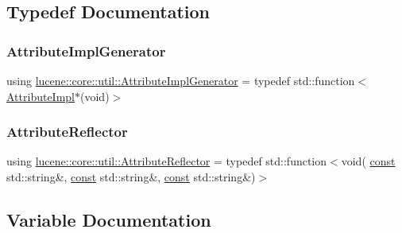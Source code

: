 \subsection{Typedef Documentation}
\mbox{\label{namespacelucene_1_1core_1_1util_acbd8821be7d7b29749374e57b0a7c40b}} 
\subsubsection{\texorpdfstring{Attribute\+Impl\+Generator}{AttributeImplGenerator}}
{\footnotesize\ttfamily using \mbox{\hyperlink{namespacelucene_1_1core_1_1util_acbd8821be7d7b29749374e57b0a7c40b}{lucene\+::core\+::util\+::\+Attribute\+Impl\+Generator}} = typedef std\+::function$<$\mbox{\hyperlink{classlucene_1_1core_1_1util_1_1AttributeImpl}{Attribute\+Impl}}$\ast$(void)$>$}

\mbox{\label{namespacelucene_1_1core_1_1util_a7dbb701adaed055f73fb95eec83da10a}} 
\subsubsection{\texorpdfstring{Attribute\+Reflector}{AttributeReflector}}
{\footnotesize\ttfamily using \mbox{\hyperlink{namespacelucene_1_1core_1_1util_a7dbb701adaed055f73fb95eec83da10a}{lucene\+::core\+::util\+::\+Attribute\+Reflector}} = typedef std\+::function$<$void( \mbox{\hyperlink{ZlibCrc32_8h_a2c212835823e3c54a8ab6d95c652660e}{const}} std\+::string\&, \mbox{\hyperlink{ZlibCrc32_8h_a2c212835823e3c54a8ab6d95c652660e}{const}} std\+::string\&, \mbox{\hyperlink{ZlibCrc32_8h_a2c212835823e3c54a8ab6d95c652660e}{const}} std\+::string\&)$>$}



\subsection{Variable Documentation}
\mbox{\label{namespacelucene_1_1core_1_1util_aff58249bc13b07b9fde5d2bce9afa79e}} 
